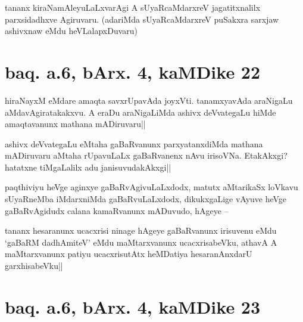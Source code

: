 
\begin{artha}
tananx kiraNamAleyuLaLxvarAgi A sUyaRcaMdarxreV jagatitxnalilx 
parxsidadhxve Agiruvaru. (adariMda sUyaRcaMdarxreV puSakxra sarxjaw 
ashivxnaw eMdu heVLalapxDuvaru)
\end{artha}

\section*{baq. a.6, bArx. 4, kaMDike 22}

\stext


\begin{artha}
hiraNayxM eMdare amaqta savxrUpavAda joyxVti. tanamxyavAda araNigaLu 
aMdavAgiratakakxvu. A eraDu araNigaLiMda ashivx deVvategaLu hiMde 
amaqtavanunx mathana mADiruvaru||
\end{artha}

\begin{artha}
ashivx deVvategaLu eMtaha gaBaRvanunx parxyatanxdiMda mathana 
mADiruvaru aMtaha rUpavuLaLx gaBaRvanenx nAvu irisoVNa. EtakAkxgi? 
hatatxne tiMgaLalilx adu janisuvudakAkxgi||
\end{artha}


\begin{artha}
paqthiviyu heVge aginxye gaBaRvAgivuLaLxdodx, matutx aMtarikaSx 
loVkavu sUyaRneMba iMdarxniMda gaBaRvuLaLxdodx, dikukxgaLige vAyuve 
heVge gaBaRvAgidudx calana kamaRvanunx mADuvudo, hAgeye --
\end{artha}


\begin{artha}
tananx hesaranunx ucacxrisi ninage hAgeye gaBaRvanunx irisuvenu eMdu 
`gaBaRM dadhAmiteV' eMdu maMtarxvanunx ucacxrisabeVku, athavA A 
maMtarxvanunx patiyu ucacxrisutAtx heMDatiya hesaranAnxdarU 
garxhisabeVku||
\end{artha}

\section*{baq. a.6, bArx. 4, kaMDike 23}

\stext


